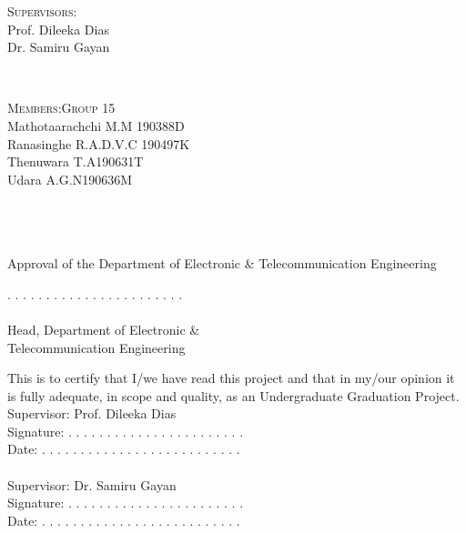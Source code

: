 \documentclass[12pt]{report}
\newcommand{\groupnumber}{Group 15}
\newcommand{\memberone}{Mathotaarachchi M.M }
\newcommand{\membertwo}{Ranasinghe R.A.D.V.C }
\newcommand{\memberthree}{Thenuwara T.A}
\newcommand{\memberfour}{Udara A.G.N}
\newcommand{\memberoneid}{190388D}
\newcommand{\membertwoid}{190497K}
\newcommand{\memberthreeid}{190631T}
\newcommand{\memberfourid}{190636M}
\newcommand{\supervisorone}{Prof. Dileeka Dias}
\newcommand{\supervisortwo}{Dr. Samiru Gayan}
\begin{document}
\begin{titlepage}
\begin{minipage}{0.5\textwidth}
	\begin{flushleft} \large
		\textsc{Supervisors:} \\[.25cm]
	\supervisorone\\ %
	\supervisortwo \\%
	\end{flushleft}
\end{minipage}
~	
	\begin{minipage}{0.4\textwidth}
		\begin{flushleft} \large
			\textsc{Members:\hfill \groupnumber}\\[.25cm] 
			\memberone \hfill \memberoneid\\
			\membertwo \hfill \membertwoid\\
			\memberthree\hfill \memberthreeid\\
			\memberfour\hfill \memberfourid\\
		\end{flushleft}
	\end{minipage}\\
	
\end{titlepage}


\section*{} %
Approval of the Department of Electronic \& Telecommunication Engineering\\[1cm]

\begin{flushright}
\begin{minipage}{.5\textwidth}

. . . . . . . . . . . . . . . . . . . . . . .  \\ \\
	Head, Department of Electronic \&\\
	Telecommunication Engineering
	
\end{minipage}
\end{flushright}

\vspace*{2cm}
\noindent
This is to certify that I/we have read this project and that in my/our opinion it is fully adequate, in scope and quality, as an Undergraduate Graduation Project.
\\[.5cm]

\noindent
Supervisor: \supervisorone \\[1cm]
Signature: . . . . . . . . . . . . . . . . . . . . . . .  \\[1cm] 
Date: . . . . . . . . . . . . . . . . . . . . . . . . . .  \\[1cm]
\\[1cm]
Supervisor: \supervisortwo \\[1cm]
Signature: . . . . . . . . . . . . . . . . . . . . . . .  \\[1cm]
Date: . . . . . . . . . . . . . . . . . . . . . . . . . .  \\[1cm]
\end{document}

